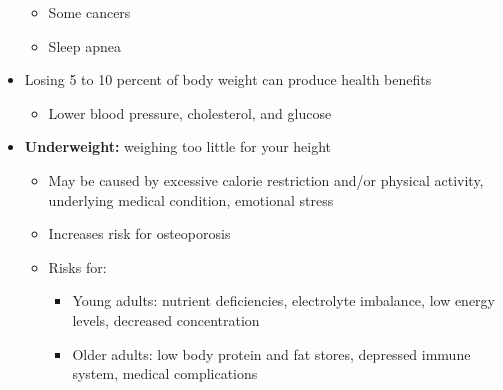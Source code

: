 \documentclass[12pt]{article}
\begin{document}
\begin{itemize}
\begin{itemize}
                        \item Some cancers
                        \item Sleep apnea
                    \end{itemize}
                \item Losing 5 to 10 percent of body weight can produce health benefits
                    \begin{itemize}
                        \item Lower blood pressure, cholesterol, and glucose
                    \end{itemize}
                \item \textbf{Underweight:} weighing too little for your height
                    \begin{itemize}
                        \item May be caused by excessive calorie restriction and/or physical activity, underlying medical condition, emotional stress
                        \item Increases risk for osteoporosis
                        \item Risks for:
                            \begin{itemize}
                                \item Young adults: nutrient deficiencies, electrolyte imbalance, low energy levels, decreased concentration
                                \item Older adults: low body protein and fat stores, depressed immune system, medical complications
                            \end{itemize}
                    \end{itemize}
            \end{itemize}
\end{document}
